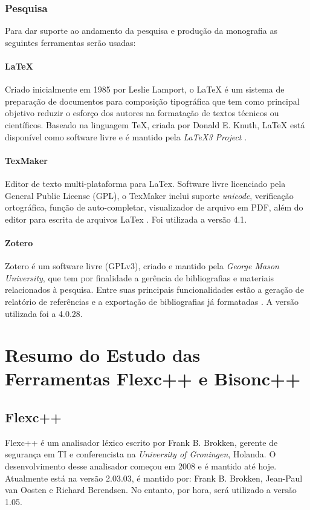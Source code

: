 \begin{apendicesenv}
\subsection{Pesquisa}
Para dar suporte ao andamento da pesquisa e produção da monografia as seguintes ferramentas serão usadas:

\subsubsection{LaTeX}
Criado inicialmente em 1985 por Leslie Lamport, o LaTeX é um sistema de preparação de documentos para composição tipográfica que tem como principal objetivo reduzir o esforço dos autores na formatação de textos técnicos ou científicos. Baseado na linguagem TeX, criada por Donald E. Knuth, LaTeX está disponível como software livre e é mantido pela \textit{LaTeX3 Project} \cite{latex2015}.

\subsubsection{TexMaker}
Editor de texto multi-plataforma para LaTex. Software livre licenciado pela General Public License (GPL), o TexMaker inclui suporte \textit{unicode}, verificação ortográfica, função de auto-completar, visualizador de arquivo em PDF, além do editor para escrita de arquivos LaTex \cite{texmaker2014}. Foi utilizada a versão 4.1.

\subsubsection{Zotero}
Zotero é um software livre (GPLv3), criado e mantido pela \textit{George Mason University}, que tem por finalidade a gerência de bibliografias e materiais relacionados à pesquisa. Entre suas principais funcionalidades estão a geração de relatório de referências e a exportação de bibliografias já formatadas \cite{zotero2015}. A versão utilizada foi a 4.0.28.

\chapter{Resumo do Estudo das Ferramentas Flexc++ e Bisonc++}

\section{Flexc++}
Flexc++ é um analisador léxico escrito por Frank B. Brokken, gerente de segurança em TI e conferencista na \textit{University of Groningen}, Holanda. O desenvolvimento desse analisador começou em 2008 e é mantido até hoje. Atualmente está na versão 2.03.03, é mantido por: Frank B. Brokken, Jean-Paul van Oosten e Richard Berendsen. No entanto, por hora, será utilizado a versão 1.05.


\end{apendicesenv}
